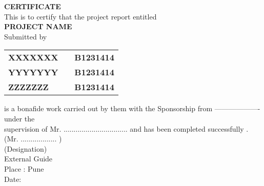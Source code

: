 \begin{center}
\thispagestyle{empty}
\vspace*{4\baselineskip}
\LARGE{\textbf{CERTIFICATE}}\\[1.0cm]
\large{This is to certify that the project report entitled}\\[0.7cm]
\Large{\textbf{PROJECT NAME}}\\[0.7cm]
\normalsize{Submitted by}\\[0.3cm]
\end{center}
\begin{table}[h]\large
\centering
\begin{tabular}{>{\bfseries}lc>{\bfseries}r}
XXXXXXX & & B1231414\\ %
YYYYYYY & & B1231414\\ %
ZZZZZZZ & & B1231414\\ %
\end{tabular}
\end{table}
\normalsize{is a bonafide work carried out by them with the Sponsorship from ------------------- under the
\\supervision of Mr. ................................ and has been completed successfully .}\\[1.5cm]
\normalsize{(Mr. .................. )}\\
\normalsize{(Designation)}\\
\normalsize{External Guide}\\[1cm]
\normalsize{Place : Pune}\\
\normalsize{Date:}\\
\newpage
